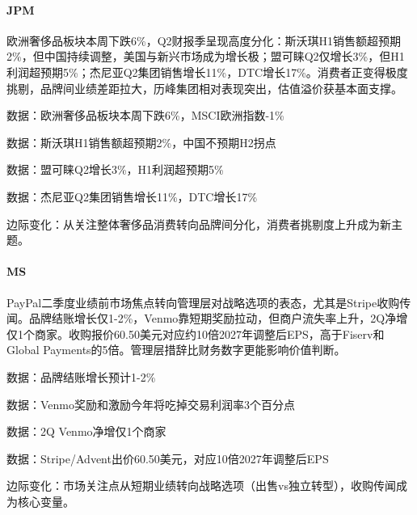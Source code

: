 \documentclass[11pt]{ctexart}
\begin{document}
\paragraph{JPM} 欧洲奢侈品板块本周下跌6\%，Q2财报季呈现高度分化：斯沃琪H1销售额超预期2\%，但中国持续调整，美国与新兴市场成为增长极；盟可睐Q2仅增长3\%，但H1利润超预期5\%；杰尼亚Q2集团销售增长11\%，DTC增长17\%。消费者正变得极度挑剔，品牌间业绩差距拉大，历峰集团相对表现突出，估值溢价获基本面支撑。
{\small\color{refgray}数据：欧洲奢侈品板块本周下跌6\%，MSCI欧洲指数-1\%\par}
{\small\color{refgray}数据：斯沃琪H1销售额超预期2\%，中国不预期H2拐点\par}
{\small\color{refgray}数据：盟可睐Q2增长3\%，H1利润超预期5\%\par}
{\small\color{refgray}数据：杰尼亚Q2集团销售增长11\%，DTC增长17\%\par}
{\small\color{refgray}边际变化：从关注整体奢侈品消费转向品牌间分化，消费者挑剔度上升成为新主题。\par}
\paragraph{MS} PayPal二季度业绩前市场焦点转向管理层对战略选项的表态，尤其是Stripe收购传闻。品牌结账增长仅1-2\%，Venmo靠短期奖励拉动，但商户流失率上升，2Q净增仅1个商家。收购报价60.50美元对应约10倍2027年调整后EPS，高于Fiserv和Global Payments的5倍。管理层措辞比财务数字更能影响价值判断。
{\small\color{refgray}数据：品牌结账增长预计1-2\%\par}
{\small\color{refgray}数据：Venmo奖励和激励今年将吃掉交易利润率3个百分点\par}
{\small\color{refgray}数据：2Q Venmo净增仅1个商家\par}
{\small\color{refgray}数据：Stripe/Advent出价60.50美元，对应10倍2027年调整后EPS\par}
{\small\color{refgray}边际变化：市场关注点从短期业绩转向战略选项（出售vs独立转型），收购传闻成为核心变量。\par}
\end{document}
